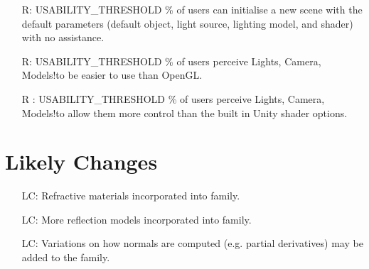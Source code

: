 \documentclass[12pt]{article}
\newcounter{reqnum} %
\newcounter{lcnum} %
\newcommand{\famname}{Lights, Camera, Models!} %
\begin{document}
\begin{itemize}
	USABILITY\_THRESHOLD \% of users can change the parameters of the lighting 
	models and re-render an existing scene with no assistance.
	\item[R\refstepcounter{reqnum}\thereqnum \label{NFR-Usability-new}:] 
	USABILITY\_THRESHOLD \% of users can initialise a new scene with the 
	default parameters (default object, light source, lighting model, and 
	shader) with no assistance.
	\item[R\refstepcounter{reqnum}\thereqnum \label{NFR-Usability-perceived}:] 
	USABILITY\_THRESHOLD \% of users perceive \famname to be easier to use than 
	OpenGL.
	\item[R\refstepcounter{reqnum}\thereqnum 
	\label{NFR-Usability-control-perceived}:] 
	USABILITY\_THRESHOLD \% of users perceive \famname to allow them more 
	control than the built in Unity shader options.
\end{itemize}


\section{Likely Changes}    

\noindent \begin{itemize}

\item[LC\refstepcounter{lcnum}\thelcnum\label{LC_refraction}:] Refractive 
materials incorporated into family.
\item[LC\refstepcounter{lcnum}\thelcnum\label{LC_reflection_models}:] More 
reflection models incorporated into family.
\item[LC\refstepcounter{lcnum}\thelcnum\label{LC_normals}:] Variations on how 
normals are computed (e.g. partial derivatives) may be added to the family.

\end{itemize}
\end{document}
